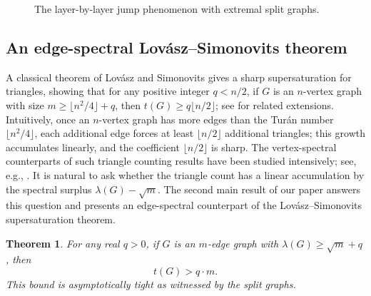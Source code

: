 \documentclass[10pt,a4paper]{amsart}
\newtheorem{theorem}{Theorem}[section]
\renewcommand{\ge}{\geqslant}
\begin{document}
\begin{figure}[htbp]
\vspace{-2mm}
\caption{The layer-by-layer jump phenomenon with extremal split graphs.}
\label{fig:jump-layers}
\end{figure}
 
 
\vspace{-3mm}
\subsection{An edge-spectral Lov\'{a}sz--Simonovits theorem}


A classical theorem of Lov\'asz and Simonovits \cite{LovaszSimonovits1975,LS1983}
gives a sharp supersaturation for triangles, showing that for any positive integer $q< n/2$, if $G$ is an $n$-vertex graph with size $m\ge \lfloor n^2/4 \rfloor +q$, then $t(G)\ge q\lfloor n/2 \rfloor$; see \cite{Mubayi2010, PY2017, MY2023} for related extensions.   
Intuitively, once an $n$-vertex graph has more edges than the Tur\'{a}n number $\lfloor n^2/4\rfloor$, each additional edge forces at least $\lfloor n/2\rfloor$ additional triangles; this growth accumulates linearly, and the coefficient $\lfloor n/2\rfloor$ is sharp. 
The vertex-spectral counterparts of such triangle counting
results have been studied intensively; see, e.g., \cite{LiFengPeng2026, FLLM2025}. 
It is natural to ask whether the triangle count has a linear accumulation by the spectral surplus $\lambda(G)-\sqrt{m}$. 
The second main result of our paper answers this question and presents an edge-spectral counterpart of the Lov\'{a}sz--Simonovits supersaturation theorem. 




\begin{theorem}  \label{thm-edge-spect-LS}
For any real $q> 0$, if $G$ is an $m$-edge graph with $\lambda (G) \ge \sqrt{m}+ q$, then 
$$t(G)> q\cdot m. $$ 
This bound is asymptotically tight as witnessed by the split graphs.
\end{theorem} 
\end{document}
